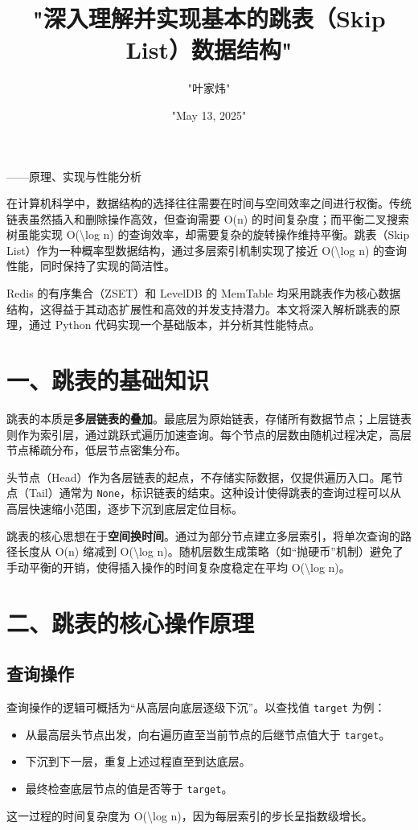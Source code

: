 \title{"深入理解并实现基本的跳表（Skip List）数据结构"}
\author{"叶家炜"}
\date{"May 13, 2025"}
\maketitle
——原理、实现与性能分析\par
在计算机科学中，数据结构的选择往往需要在时间与空间效率之间进行权衡。传统链表虽然插入和删除操作高效，但查询需要 O(n) 的时间复杂度；而平衡二叉搜索树虽能实现 O(\textbackslash{}log n) 的查询效率，却需要复杂的旋转操作维持平衡。跳表（Skip List）作为一种概率型数据结构，通过多层索引机制实现了接近 O(\textbackslash{}log n) 的查询性能，同时保持了实现的简洁性。\par
Redis 的有序集合（ZSET）和 LevelDB 的 MemTable 均采用跳表作为核心数据结构，这得益于其动态扩展性和高效的并发支持潜力。本文将深入解析跳表的原理，通过 Python 代码实现一个基础版本，并分析其性能特点。\par
\chapter{一、跳表的基础知识}
跳表的本质是\textbf{多层链表的叠加}。最底层为原始链表，存储所有数据节点；上层链表则作为索引层，通过跳跃式遍历加速查询。每个节点的层数由随机过程决定，高层节点稀疏分布，低层节点密集分布。\par
头节点（Head）作为各层链表的起点，不存储实际数据，仅提供遍历入口。尾节点（Tail）通常为 \verb!None!，标识链表的结束。这种设计使得跳表的查询过程可以从高层快速缩小范围，逐步下沉到底层定位目标。\par
跳表的核心思想在于\textbf{空间换时间}。通过为部分节点建立多层索引，将单次查询的路径长度从 O(n) 缩减到 O(\textbackslash{}log n)。随机层数生成策略（如“抛硬币”机制）避免了手动平衡的开销，使得插入操作的时间复杂度稳定在平均 O(\textbackslash{}log n)。\par
\chapter{二、跳表的核心操作原理}
\section{查询操作}
查询操作的逻辑可概括为“从高层向底层逐级下沉”。以查找值 \verb!target! 为例：\par
\begin{itemize}
\item 从最高层头节点出发，向右遍历直至当前节点的后继节点值大于 \verb!target!。
\item 下沉到下一层，重复上述过程直至到达底层。
\item 最终检查底层节点的值是否等于 \verb!target!。
\end{itemize}
这一过程的时间复杂度为 O(\textbackslash{}log n)，因为每层索引的步长呈指数级增长。\par
